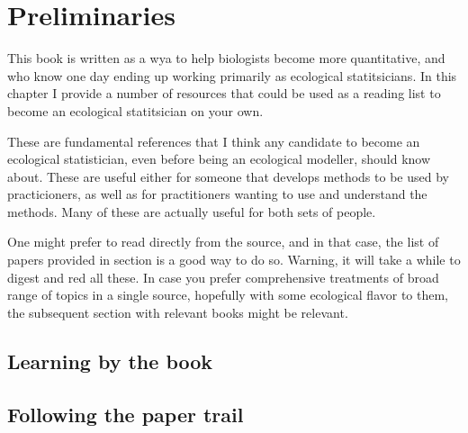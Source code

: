 \documentclass[
]{book}
\begin{document}
\hypertarget{prelim}{%
\chapter{Preliminaries}\label{prelim}}

This book is written as a wya to help biologists become more quantitative, and who know one day ending up working primarily as ecological statitsicians. In this chapter I provide a number of resources that could be used as a reading list to become an ecological statitsician on your own.

These are fundamental references that I think any candidate to become an ecological statistician, even before being an ecological modeller, should know about. These are useful either for someone that develops methods to be used by practicioners, as well as for practitioners wanting to use and understand the methods. Many of these are actually useful for both sets of people.

One might prefer to read directly from the source, and in that case, the list of papers provided in section \citet{lbtb} is a good way to do so. Warning, it will take a while to digest and red all these. In case you prefer comprehensive treatments of broad range of topics in a single source, hopefully with some ecological flavor to them, the subsequent section \citet{ftpt} with relevant books might be relevant.

\hypertarget{lbtb}{%
\section{Learning by the book}\label{lbtb}}

\citet{Zuur2009a}

\citet{Zuur2007}

\citet{Zuur2009b}

\citet{Faraway2006}

\hypertarget{ftpt}{%
\section{Following the paper trail}\label{ftpt}}
\end{document}
